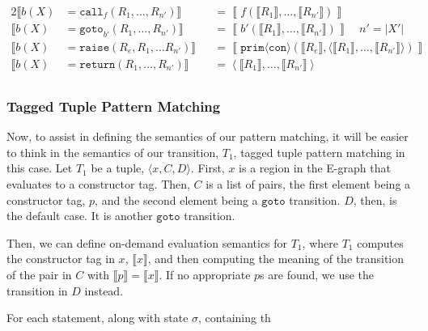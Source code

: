 \documentclass{article}
\begin{document}
\begin{alignat*}{2}
  \llbracket b (X) &= \texttt{call}_{f} \left( R_1, \dots, R_{n'} \right) \rrbracket
                   &&= \left\llbracket f \left( \llbracket R_1 \rrbracket, \dots, \llbracket R_{n'} \rrbracket \right) \right\rrbracket \\
  \llbracket b (X) &= \texttt{goto}_{b'} \left( R_1, \dots, R_{n'} \right)\rrbracket
                   &&= \left\llbracket b' \left( \llbracket R_1 \rrbracket, \dots, \llbracket R_{n'} \rrbracket \right) \right\rrbracket \quad n' = |X'| \\
  \llbracket b (X) &= \texttt{raise} \left( R_e, R_1, \dots R_{n'} \right) \rrbracket 
                   &&=\left\llbracket \texttt{prim}\langle\texttt{con}\rangle \left( \llbracket R_e \rrbracket, \langle \llbracket R_1 \rrbracket, \dots, \llbracket R_{n'} \rrbracket \rangle \right) \right\rrbracket \\
  \llbracket b (X) &= \texttt{return} \left( R_1, \dots, R_{n'} \right) \rrbracket
                  &&= \left\langle \llbracket R_1 \rrbracket, \dots, \llbracket R_{n'} \rrbracket \right\rangle \\
\end{alignat*}



\subsubsection{Tagged Tuple Pattern Matching}

Now, to assist in defining the semantics of our pattern matching, it will be easier to think in the semantics of our transition, $T_1$, tagged tuple pattern matching in this case. Let $T_1$ be a tuple, $\langle x, C, D \rangle$. First, $x$ is a region in the E-graph that evaluates to a constructor tag. Then, $C$ is a list of pairs, the first element being a constructor tag, $p$, and the second element being a $\texttt{goto}$ transition. $D$, then, is the default case. It is another $\texttt{goto}$ transition.

Then, we can define on-demand evaluation semantics for $T_1$, where $T_1$ computes the constructor tag in $x$, $\llbracket x \rrbracket$, and then computing the meaning of the transition of the pair in $C$ with $\llbracket p \rrbracket = \llbracket x \rrbracket$. If no appropriate $p$s are found, we use the transition in $D$ instead.

For each statement, along with state $\sigma$, containing th
\end{document}
